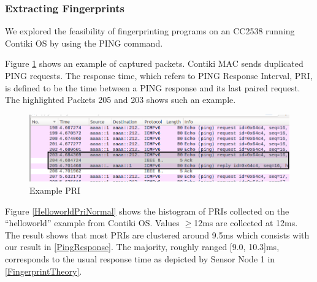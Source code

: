\documentclass{article}
\begin{document}
\subsubsection{Extracting Fingerprints}
We explored the feasibility of fingerprinting programs on an CC2538 running Contiki OS by using the PING command.

Figure \ref{ExamplePri} shows an example of captured packets. Contiki MAC\cite{ContikiMAC} sends duplicated PING requests. The response time, which refers to PING Response Interval, PRI, is defined to be the time between a PING response and its last paired request. The highlighted Packets 205 and 203 shows such an example.

\begin{figure}[!h]
	\centering
	\includegraphics[width=\textwidth]{fig/PRI_hl.png}
	\caption{Example PRI\label{ExamplePri}}
\end{figure}


Figure \ref{HelloworldPriNormal} shows the histogram of PRIs collected on the ``helloworld'' example from Contiki OS. Values $\geq$12ms are collected at 12ms. The result shows that most PRIs are clustered around 9.5ms which consists with our result in \ref{PingResponse}. The majority, roughly ranged [9.0, 10.3]ms, corresponds to the usual response time as depicted by Sensor Node 1 in \ref{FingerprintTheory}. 
\end{document}
